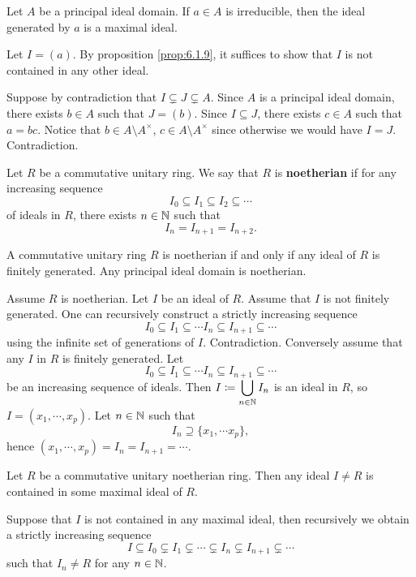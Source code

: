 \begin{propositionenv}
    Let $A$ be a principal ideal domain.
    If $a \in A$ is irreducible,
    then the ideal generated by $a$ is a maximal ideal.
\end{propositionenv}
\begin{proofenv}
    Let $I = (a)$.
    By proposition \ref{prop:6.1.9},
    it suffices to show that $I$ is not contained in any other ideal.

    \quad Suppose by contradiction that $I \subsetneq J \subsetneq A$.
    Since $A$ is a principal ideal domain,
    there exists $b \in A$ such that $J = (b)$.
    Since $I \subseteq J$,
    there exists $c \in A$ such that $a = bc$.
    Notice that $b \in A \setminus A^\times$, $c \in A \setminus A^\times$ since otherwise we would have $I = J$.
    Contradiction.
\end{proofenv}

\begin{definitionenv}
    Let $R$ be a commutative unitary ring.
    We say that $R$ is \textbf{noetherian} if for any increasing sequence
    $$I_0 \subseteq I_1 \subseteq I_2 \subseteq \cdots$$
    of ideals in $R$, there exists $n \in \mathbb{N}$ such that
    $$I_n = I_{n+1} = I_{n+2}.$$
\end{definitionenv}

\begin{propositionenv}
    A commutative unitary ring $R$ is noetherian if and only if any ideal of $R$ is finitely generated.
    Any principal ideal domain is noetherian.
\end{propositionenv}
\begin{proofenv}
    Assume $R$ is noetherian.
    Let $I$ be an ideal of $R$.
    Assume that $I$ is not finitely generated.
    One can recursively construct a strictly increasing sequence
    $$I_0 \subseteq I_1 \subseteq \cdots I_n \subseteq I_{n+1} \subseteq \cdots$$
    using the infinite set of generations of $I$.
    Contradiction.
    Conversely assume that any $I$ in $R$ is finitely generated.
    Let 
    $$I_0 \subseteq I_1 \subseteq \cdots I_n \subseteq I_{n+1} \subseteq \cdots$$
    be an increasing sequence of ideals.
    Then $\displaystyle I \coloneq \bigcup_{n \in \mathbb{N}} I_n$ is an ideal in $R$, so $I = (x_1,\cdots,x_p)$.
    Let $n \in \mathbb{N}$ such that
    $$I_n \supseteq \{x_1,\cdots x_p\},$$
    hence $(x_1,\cdots,x_p) = I_n = I_{n+1} = \cdots$.
\end{proofenv}

\begin{corollaryenv}\label{cor:6.1.14}
    Let $R$ be a commutative unitary noetherian ring.
    Then any ideal $I \neq R$ is contained in some maximal ideal of $R$.
\end{corollaryenv}
\begin{proofenv}
    Suppose that $I$ is not contained in any maximal ideal, then recursively we obtain a strictly increasing sequence
    $$I \subseteq I_0 \subsetneq I_1 \subsetneq \cdots \subsetneq I_n \subsetneq I_{n+1} \subsetneq \cdots$$
    such that $I_n \neq R$ for any $n \in \mathbb{N}$.
\end{proofenv}

